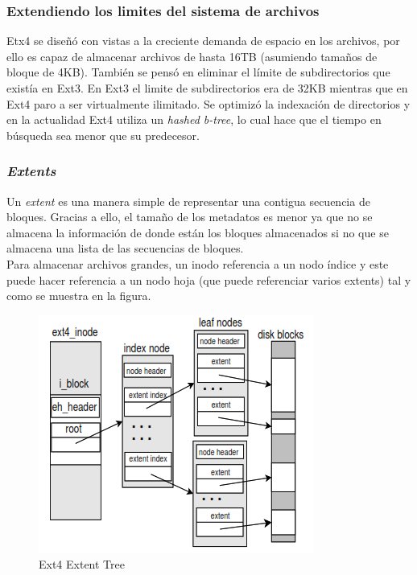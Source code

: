 \subsubsection{Extendiendo los limites del sistema de archivos}
Etx4 se diseñó con vistas a la creciente demanda de espacio en los archivos, por ello es capaz de almacenar archivos de hasta 16TB (asumiendo tamaños de bloque de 4KB). También se pensó en eliminar el límite de subdirectorios que existía en Ext3. En Ext3 el limite de subdirectorios era de 32KB mientras que en Ext4 paro a ser virtualmente ilimitado. Se optimizó la indexación de directorios y en la actualidad Ext4 utiliza un \textit{hashed b-tree}, lo cual hace que el tiempo en búsqueda sea menor que su predecesor. \cite{jones_2009}

\subsubsection{\textit{Extents}}
Un \textit{extent} es una manera simple de representar una contigua secuencia de bloques. Gracias a ello, el tamaño de los metadatos es menor ya que no se almacena la información de donde están los bloques almacenados si no que se almacena una lista de las secuencias de bloques.\\

Para almacenar archivos grandes, un inodo referencia a un nodo índice y este puede hacer referencia a un nodo hoja (que puede referenciar varios extents) tal y como se muestra en la figura.

\begin{figure}[H]
    \centering
    \includegraphics{doc/assets/images/ext4/ext4_map_extent_tree.PNG}
    \caption{Ext4 Extent Tree}
    \label{fig:Ext4 Extent Tree}
\end{figure}

